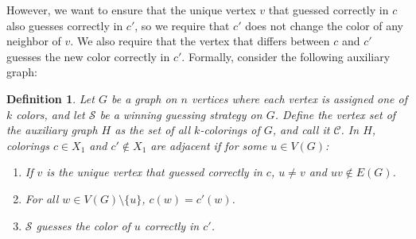 \documentclass{amsart}
\newcommand{\1}{\mathds{1}}
\newtheorem{definition}[theorem]{Definition}
\numberwithin{theorem}{section}
\def\cS{\ensuremath{\mathcal{S}}}
\begin{document}
However, we want to ensure that the unique vertex $v$ that guessed correctly in $c$ also guesses correctly in $c'$, so we require that $c'$ does not change the color of any neighbor of $v$. We also require that the vertex that differs between $c$ and $c'$ guesses the new color correctly in $c'$. Formally, consider
the following auxiliary graph:

\begin{definition}
Let $G$ be a graph on $n$ vertices where each vertex is assigned one of $k$ colors, and let $\cS$ be a winning guessing strategy on $G$. Define the vertex set of the auxiliary graph $H$ as the set of all $k$-colorings of $G$, and call it $\mathcal{C}$. In $H$, colorings $c \in X_1$ and $c' \notin X_1$ are adjacent if for some $u \in V(G)$:
\begin{enumerate}[(P\arabic*)]
    \item If $v$ is the unique vertex that guessed correctly in $c$, $u \neq v$ and $uv \notin E(G)$. 
    \item For all $w \in V(G) \setminus \{u\}$, $c(w)=c'(w)$.
    \item $\cS$ guesses the color of $u$ correctly in $c'$. 
\end{enumerate}
\end{definition}
\end{document}
